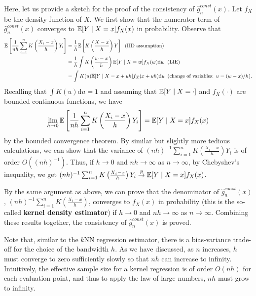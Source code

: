 \documentclass[11pt, A4paper, openany, uplatex]{book}
\begin{document}
Here, let us provide a sketch for the proof of the consistency of $\hat g^{const}_n(x)$.
Let $f_X$ be the density function of $X$.
We first show that the numerator term of $\hat g^{const}_n(x)$ converges to $\mathbb{E}[Y \mid X = x]f_X(x)$ in probability.
Observe that
\begin{align*}
	\mathbb{E}\left[\frac{1}{nh} \sum_{i = 1}^n K\left( \frac{X_i - x}{h}\right) Y_i \right] 
	& = \frac{1}{h}\mathbb{E}\left[ K\left( \frac{X - x}{h}\right) Y \right] \;\; \text{(IID assumption)}\\
	& = \frac{1}{h}\int K\left( \frac{w - x}{h}\right) \mathbb{E}[ Y \mid X = w] f_X (w)\text{d}w \;\; \text{(LIE)} \\
	& = \int K(u) \mathbb{E}[ Y \mid X = x + uh] f_X (x + uh)\text{d}u \;\; \text{(change of variables: $u = (w-x)/h$)}.
\end{align*}
Recalling that $\int K(u)\text{d}u = 1$ and assuming that $\mathbb{E}[ Y \mid X = \cdot]$ and $f_X (\cdot)$ are bounded continuous functions, we have 
\begin{align*}
	\lim_{h \to 0} \mathbb{E}\left[\frac{1}{nh} \sum_{i = 1}^n K\left( \frac{X_i - x}{h}\right) Y_i \right] = \mathbb{E}[ Y \mid X = x] f_X (x)
\end{align*}
by the bounded convergence theorem.
By similar but slightly more tedious calculations, we can show that the variance of $(nh)^{-1} \sum_{i = 1}^n K\left( \frac{X_i - x}{h}\right) Y_i$ is of order $O((nh)^{-1})$.
Thus, if $h \to 0$ and $nh \to \infty$ as $n \to \infty$, by Chebyshev's inequality, we get $(nh)^{-1} \sum_{i = 1}^n K\left( \frac{X_i - x}{h}\right) Y_i \overset{p}{\to} \mathbb{E}[ Y \mid X = x] f_X (x)$.

By the same argument as above, we can prove that the denominator of $\hat g^{const}_n(x)$, $(nh)^{-1} \sum_{i = 1}^n K\left( \frac{X_i - x}{h}\right)$, converges to $f_X(x)$ in probability (this is the so-called \textbf{kernel density estimator}) if $h \to 0$ and $nh \to \infty$ as $n \to \infty$.
Combining these results together, the consistency of $\hat g^{const}_n(x)$ is proved.

Note that, similar to the $k$NN regression estimator, there is a bias-variance trade-off for the choice of the bandwidth $h$.
As we have discussed, as $n$ increases, $h$ must converge to zero sufficiently slowly so that $nh$ can increase to infinity.
Intuitively, the effective sample size for a kernel regression is of order $O(nh)$ for each evaluation point, and thus to apply the law of large numbers, $nh$ must grow to infinity.
\end{document}
